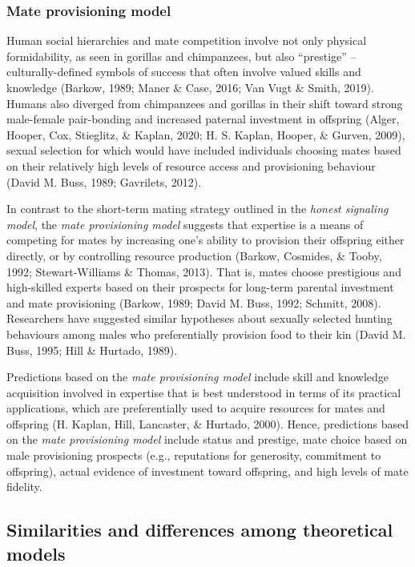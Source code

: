 \documentclass[
  11pt,
]{article}
\begin{document}
\hypertarget{mate-provisioning-model}{%
\subsubsection{Mate provisioning model}\label{mate-provisioning-model}}

Human social hierarchies and mate competition involve not only physical formidability, as seen in gorillas and chimpanzees, but also ``prestige'' -- culturally-defined symbols of success that often involve valued skills and knowledge (Barkow, 1989; Maner \& Case, 2016; Van Vugt \& Smith, 2019). Humans also diverged from chimpanzees and gorillas in their shift toward strong male-female pair-bonding and increased paternal investment in offspring (Alger, Hooper, Cox, Stieglitz, \& Kaplan, 2020; H. S. Kaplan, Hooper, \& Gurven, 2009), sexual selection for which would have included individuals choosing mates based on their relatively high levels of resource access and provisioning behaviour (David M. Buss, 1989; Gavrilets, 2012).

In contrast to the short-term mating strategy outlined in the \emph{honest signaling model}, the \emph{mate provisioning model} suggests that expertise is a means of competing for mates by increasing one's ability to provision their offspring either directly, or by controlling resource production (Barkow, Cosmides, \& Tooby, 1992; Stewart-Williams \& Thomas, 2013). That is, mates choose prestigious and high-skilled experts based on their prospects for long-term parental investment and mate provisioning (Barkow, 1989; David M. Buss, 1992; Schmitt, 2008). Researchers have suggested similar hypotheses about sexually selected hunting behaviours among males who preferentially provision food to their kin (David M. Buss, 1995; Hill \& Hurtado, 1989).

Predictions based on the \emph{mate provisioning model} include skill and knowledge acquisition involved in expertise that is best understood in terms of its practical applications, which are preferentially used to acquire resources for mates and offspring (H. Kaplan, Hill, Lancaster, \& Hurtado, 2000). Hence, predictions based on the \emph{mate provisioning model} include status and prestige, mate choice based on male provisioning prospects (e.g., reputations for generosity, commitment to offspring), actual evidence of investment toward offspring, and high levels of mate fidelity.

\hypertarget{similarities-and-differences-among-theoretical-models}{%
\subsection{Similarities and differences among theoretical models}\label{similarities-and-differences-among-theoretical-models}}
\end{document}

